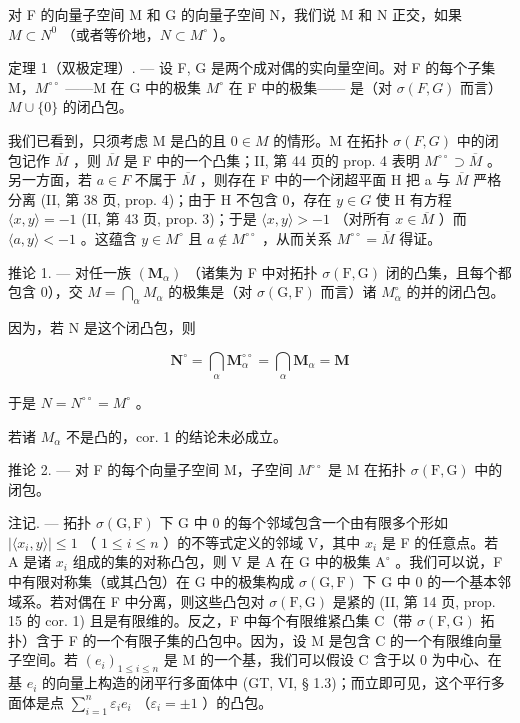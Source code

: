 对 F 的向量子空间 M 和 G 的向量子空间 N，我们说 M 和 N 正交，如果 \(M \subset N^{0}\) （或者等价地，\(N \subset M^{\circ}\) ）。

定理 1（双极定理）. --- 设 F, G 是两个成对偶的实向量空间。对 F 的每个子集 M，\(M^{\circ\circ}\) ——M 在 G 中的极集 \(M^{\circ}\) 在 F 中的极集—— 是（对 \(\sigma(F, G)\) 而言）\(M \cup \{0\}\) 的闭凸包。

我们已看到，只须考虑 M 是凸的且 \(0 \in M\) 的情形。M 在拓扑 \(\sigma(F, G)\) 中的闭包记作 \(\overline{M}\) ，则 \(\overline{M}\) 是 F 中的一个凸集；II, 第 44 页的 prop. 4 表明 \(M^{\circ\circ} \supset \overline{M}\) 。另一方面，若 \(a \in F\) 不属于 \(\overline{M}\) ，则存在 F 中的一个闭超平面 H 把 a 与 \(\overline{M}\) 严格分离 (II, 第 38 页, prop. 4)；由于 H 不包含 0，存在 \(y \in G\) 使 H 有方程 \(\langle x, y \rangle = -1\) (II, 第 43 页, prop. 3)；于是 \(\langle x, y \rangle > -1\) （对所有 \(x \in \overline{M}\) ）而 \(\langle a, y \rangle < -1\) 。这蕴含 \(y \in M^{\circ}\) 且 \(a \notin M^{\circ\circ}\) ，从而关系 \(M^{\circ\circ} = \overline{M}\) 得证。

推论 1. --- 对任一族 \((\mathbf{M}_{\alpha})\) （诸集为 F 中对拓扑 \(\sigma(\mathrm{F}, \mathrm{G})\) 闭的凸集，且每个都包含 0），交 \(M = \bigcap_{\alpha} M_{\alpha}\) 的极集是（对 \(\sigma(\mathrm{G}, \mathrm{F})\) 而言）诸 \(M_{\alpha}^{\circ}\) 的并的闭凸包。

因为，若 N 是这个闭凸包，则

\[
\mathbf {N} ^ {\circ} = \bigcap_ {\alpha} \mathbf {M} _ {\alpha} ^ {\circ \circ} = \bigcap_ {\alpha} \mathbf {M} _ {\alpha} = \mathbf {M}
\]

于是 \(N = N^{\circ\circ} = M^{\circ}\) 。

若诸 \(M_{\alpha}\) 不是凸的，cor. 1 的结论未必成立。

推论 2. --- 对 F 的每个向量子空间 M，子空间 \(M^{\circ\circ}\) 是 M 在拓扑 \(\sigma(\mathrm{F}, \mathrm{G})\) 中的闭包。

注记. --- 拓扑 \(\sigma(\mathrm{G},\mathrm{F})\) 下 G 中 0 的每个邻域包含一个由有限多个形如 \(|\langle x_i,y\rangle |\leqslant 1\) （ \(1\leqslant i\leqslant n\) ）的不等式定义的邻域 V，其中 \(x_{i}\) 是 F 的任意点。若 A 是诸 \(x_{i}\) 组成的集的对称凸包，则 V 是 A 在 G 中的极集 \(\mathrm{A}^{\circ}\) 。我们可以说，F 中有限对称集（或其凸包）在 G 中的极集构成 \(\sigma(\mathrm{G},\mathrm{F})\) 下 G 中 0 的一个基本邻域系。若对偶在 F 中分离，则这些凸包对 \(\sigma(\mathrm{F},\mathrm{G})\) 是紧的 (II, 第 14 页, prop. 15 的 cor. 1) 且是有限维的。反之，F 中每个有限维紧凸集 C（带 \(\sigma(\mathrm{F},\mathrm{G})\) 拓扑）含于 F 的一个有限子集的凸包中。因为，设 M 是包含 C 的一个有限维向量子空间。若 \((e_i)_{1\leqslant i\leqslant n}\) 是 M 的一个基，我们可以假设 C 含于以 0 为中心、在基 \(e_i\) 的向量上构造的闭平行多面体中 (GT, VI, § 1.3)；而立即可见，这个平行多面体是点 \(\sum_{i=1}^{n} \varepsilon_i e_i\) （\(\varepsilon_i = \pm 1\) ）的凸包。

